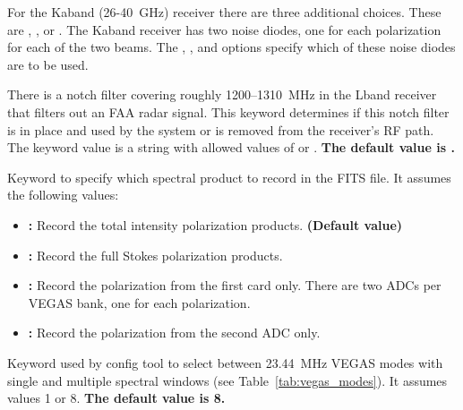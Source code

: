 \begin{description}[font=\bfseries\large,leftmargin=*]
For the \gls{Kaband} (26-40~GHz) receiver there are three additional choices.
These are , , or .  The \gls{Kaband} receiver has two
 noise diodes, one for each polarization for each of the two beams.  The
, , and  options specify which of these noise diodes are to
be used.

\item[notchfilter]  There is a notch filter covering roughly 1200--1310~MHz
in the \gls{Lband} receiver that filters out an \gls{FAA} radar
signal.  This keyword determines if this notch filter is in place and used
by the system or is removed from the receiver's \gls{RF} path.  The keyword
value is a string with allowed values of  or .
{\bf The default value is .}

\item[vegas.vpol] Keyword to specify which spectral product to record in the
FITS file. It assumes the following values:

\begin{itemize}
\item {\bf {}:} Record the total intensity polarization products.
{\bf (Default value)}
\item {\bf {}:} Record the full Stokes polarization products.
\item {\bf {}:} Record the polarization from the first 
card only. There are two \glspl{ADC} per \gls{VEGAS} bank, one for each
polarization.
\item {\bf {}:} Record the polarization from the second \gls{ADC} only.
\end{itemize}

\item[vegas.subband] Keyword used by config tool to select between
23.44~MHz \gls{VEGAS} modes with single and multiple spectral windows (see
Table~\ref{tab:vegas_modes}). It assumes values 1 or 8.
{\bf The default value is 8.}


\end{description}
